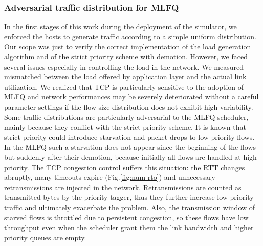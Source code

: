 \subsubsection{Adversarial traffic distribution for MLFQ}
In the first stages of this work during the deployment of the simulator, we enforced the hosts to generate traffic according to a simple uniform distribution. Our scope was just to verify the correct implementation of the load generation algorithm and of the strict priority scheme with demotion.  However, we faced several issues especially in controlling the load in the network. We measured mismatched between the load offered by application layer and the actual link utilization. We realized that TCP is particularly sensitive to the adoption of MLFQ and network performances may be severely deteriorated without a careful parameter settings if the flow size distribution does not exhibit high variability. Some traffic distributions are particularly adversarial to the MLFQ scheduler, mainly because they conflict with the strict priority scheme. It is known that strict priority could introduce starvation and packet drops to low priority flows. In the MLFQ such a starvation does not appear since the beginning of the flows but suddenly after their demotion, because initially all flows are handled at high priority. The TCP congestion control suffers this situation: the RTT changes abruptly, many timeouts expire (Fig.\ref{fig:num-rto}) and unnecessary retransmissions are injected in the network. Retransmissions are counted as transmitted bytes by the priority tagger, thus they further increase low priority traffic and ultimately exacerbate the problem. Also, the transmission window of starved flows is throttled due to persistent congestion, so these flows have low throughput even when the scheduler grant them the link bandwidth and higher priority queues are empty. 
